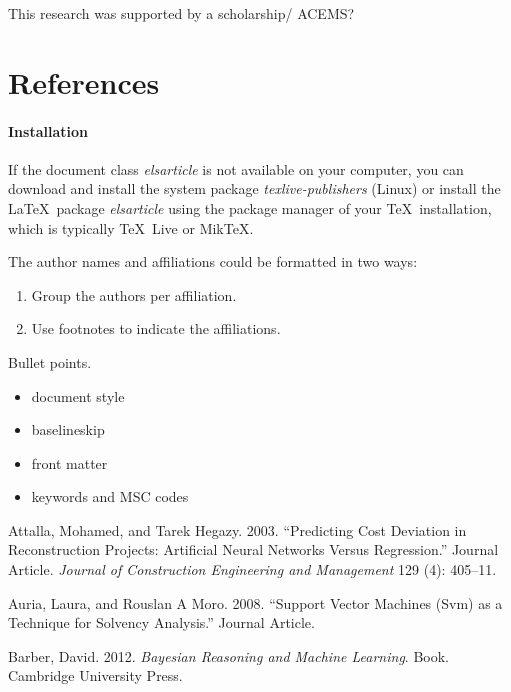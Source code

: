 \documentclass[]{elsarticle} %
\begin{document}
This research was supported by a scholarship/ ACEMS?

\section*{References}\label{references}

\paragraph{Installation}\label{installation}

If the document class \emph{elsarticle} is not available on your
computer, you can download and install the system package
\emph{texlive-publishers} (Linux) or install the LaTeX~package
\emph{elsarticle} using the package manager of your TeX~installation,
which is typically TeX~Live or MikTeX.

The author names and affiliations could be formatted in two ways:

\begin{enumerate}
\def\labelenumi{(\arabic{enumi})}
\item
  Group the authors per affiliation.
\item
  Use footnotes to indicate the affiliations.
\end{enumerate}

Bullet points.

\begin{itemize}
\item
  document style
\item
  baselineskip
\item
  front matter
\item
  keywords and MSC codes
\end{itemize}

\hypertarget{refs}{}
\hypertarget{ref-Attalla2003}{}
Attalla, Mohamed, and Tarek Hegazy. 2003. ``Predicting Cost Deviation in
Reconstruction Projects: Artificial Neural Networks Versus Regression.''
Journal Article. \emph{Journal of Construction Engineering and
Management} 129 (4): 405--11.

\hypertarget{ref-Auria2008}{}
Auria, Laura, and Rouslan A Moro. 2008. ``Support Vector Machines (Svm)
as a Technique for Solvency Analysis.'' Journal Article.

\hypertarget{ref-Barber2012}{}
Barber, David. 2012. \emph{Bayesian Reasoning and Machine Learning}.
Book. Cambridge University Press.
\end{document}
